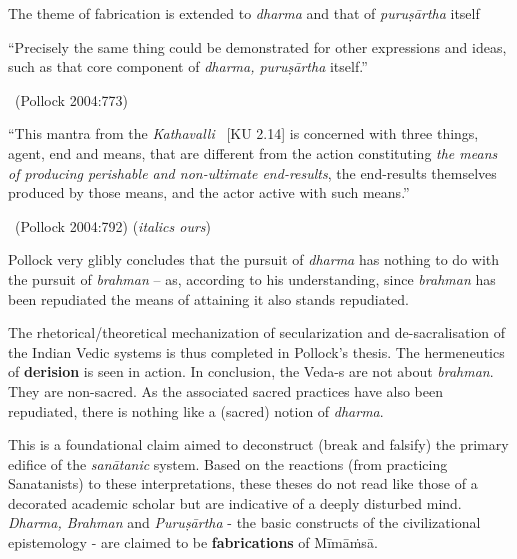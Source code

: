 The theme of fabrication is extended to \textit{dharma} and that of \textit{puruṣārtha} itself

\begin{myquote}
“Precisely the same thing could be demonstrated for other expressions and ideas, such as that core component of \textit{dharma, puruṣārtha} itself.”

~\hfill (Pollock 2004:773)
\end{myquote}

\begin{myquote}
“This mantra from the \textit{Kathavalli}  [KU 2.14] is concerned with three things, agent, end and means, that are different from the action constituting \textit{the means of producing perishable and non-ultimate end-results}, the end-results themselves produced by those means, and the actor active with such means.”

~\hfill (Pollock 2004:792) (\textit{italics ours})
\end{myquote}

Pollock very glibly concludes that the pursuit of \textit{dharma} has nothing to do with the pursuit of \textit{brahman} – as, according to his understanding, since \textit{brahman} has been repudiated the means of attaining it also stands repudiated.

The rhetorical/theoretical mechanization of secularization and de-sacralisation of the Indian Vedic systems is thus completed in Pollock’s thesis. The hermeneutics of \textbf{derision} is seen in action. In conclusion, the Veda-s are not about \textit{brahman}. They are non-sacred. As the associated sacred practices have also been repudiated, there is nothing like a (sacred) notion of \textit{dharma}.

This is a foundational claim aimed to deconstruct (break and falsify) the primary edifice of the \textit{sanātanic} system. Based on the reactions (from practicing Sanatanists) to these interpretations, these theses do not read like those of a decorated academic scholar but are indicative of a deeply disturbed mind. \textit{Dharma, Brahman} and \textit{Puruṣārtha} - the basic constructs of the civilizational epistemology - are claimed to be \textbf{fabrications} of Mīmāṁsā.


